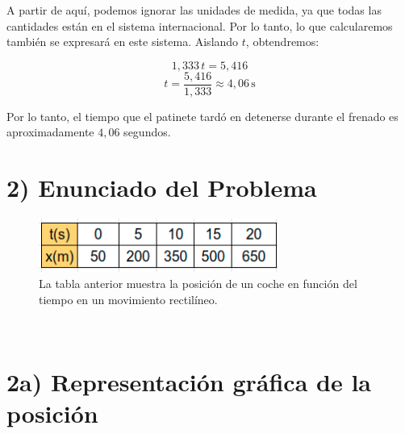 \documentclass{article}
\begin{document}
A partir de aquí, podemos ignorar las unidades de medida, ya que todas las cantidades están en el sistema internacional. Por lo tanto, lo que calcularemos también se expresará en este sistema. Aislando \( t\), obtendremos:

\[
1,333 \, t = 5,416 
\]
\[
t = \frac{5,416}{1,333} \approx 4,06 \, \text{s}
\]

Por lo tanto, el tiempo que el patinete tardó en detenerse durante el frenado es aproximadamente \( 4,06 \) segundos.

\section*{2) Enunciado del Problema}


\begin{figure}[h] %
    \centering
    \includegraphics[width=0.7\textwidth]{tabla.png} %
    \caption{La tabla anterior muestra la posición de un coche en función del tiempo en un movimiento rectilíneo.
    }
    \label{fig:tabla}
\end{figure}\

\section*{2a) Representación gráfica de la posición}

\end{document}
